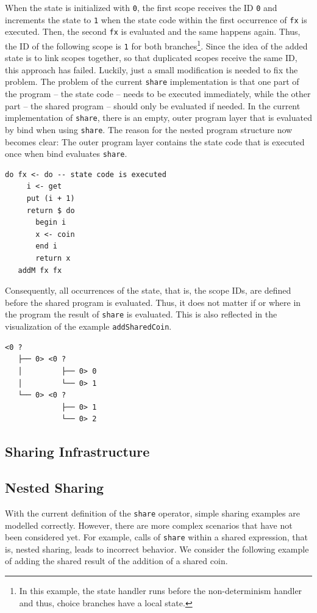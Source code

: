 \documentclass[a4paper, 11pt, fleqn, twoside]{scrreprt}
\newcommand{\hinl}[1]{\texttt{#1}}
\begin{document}
When the state is initialized with \hinl{0}, the first scope receives the ID \hinl{0} and increments the state to \hinl{1} when the state code within the first occurrence of \hinl{fx} is executed.
Then, the second \hinl{fx} is evaluated and the same happens again.
Thus, the ID of the following scope is \hinl{1} for both branches\footnote{In this example, the state handler runs before the non-determinism handler and thus, choice branches have a local state.}.
Since the idea of the added state is to link scopes together, so that duplicated scopes receive the same ID, this approach has failed.
Luckily, just a small modification is needed to fix the problem.
The problem of the current \hinl{share} implementation is that one part of the program -- the state code -- needs to be executed immediately, while the other part -- the shared program -- should only be evaluated if needed.
In the current implementation of \hinl{share}, there is an empty, outer program layer that is evaluated by bind when using \hinl{share}.
The reason for the nested program structure now becomes clear: The outer program layer contains the state code that is executed once when bind evaluates \hinl{share}.

\begin{verbatim}
do fx <- do -- state code is executed
     i <- get
     put (i + 1)
     return $ do
       begin i
       x <- coin
       end i
       return x
   addM fx fx
\end{verbatim}

Consequently, all occurrences of the state, that is, the scope IDs, are defined before the shared program is evaluated.
Thus, it does not matter if or where in the program the result of \hinl{share} is evaluated.
This is also reflected in the visualization of the example \hinl{addSharedCoin}.

\begin{verbatim}
<0 ? 
   ├── 0> <0 ? 
   │         ├── 0> 0
   │         └── 0> 1
   └── 0> <0 ? 
             ├── 0> 1
             └── 0> 2
\end{verbatim}

\subsection{Sharing Infrastructure}

\subsection{Nested Sharing}
With the current definition of the \hinl{share} operator, simple sharing examples are modelled correctly.
However, there are more complex scenarios that have not been considered yet.
For example, calls of \hinl{share} within a shared expression, that is, nested sharing, leads to incorrect behavior.
We consider the following example of adding the shared result of the addition of a shared coin.
\end{document}
